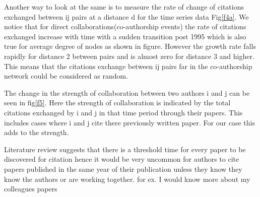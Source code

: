 \documentclass[aps, pre, twocolumn, nofootinbib]{revtex4-1}
\begin{document}
Another way to look at the same is to measure the rate of change of citations exchanged between ij pairs at a distance d for the time series data Fig\ref{f4a}. We notice that for direct collaborations(co-authorship events) the rate of citations exchanged increase with time with a sudden transition post 1995 which is also true for average degree of nodes as shown in figure. However the growth rate falls rapidly for distance 2 between pairs and is almost zero for distance 3 and higher. {\color{blue}This means that the citations exchange between ij pairs far in the co-authorship network could be considered as random.}

The change in the strength of collaboration between two authors i and j can be seen in fig\ref{f5}. Here the strength of collaboration is indicated by the total citations exchanged by i and j in that time period through their papers. This includes cases where i and j cite there previously written paper. For our case this adds to the strength. 

{\color{red}Literature review suggests that there is a threshold time for every paper to be discovered for citation hence it would be very uncommon for authors to cite papers published in the same year of their publication unless they know they know the authors or are working together. for ex. I would know more about my colleagues papers}
\end{document}
